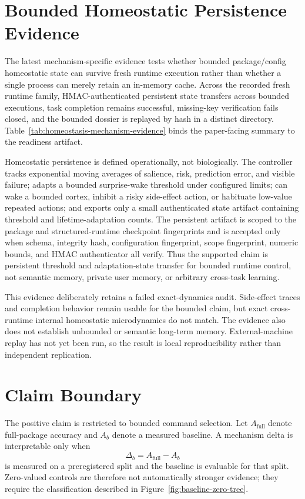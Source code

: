 \documentclass[11pt]{article}
\begin{document}
\section{Bounded Homeostatic Persistence Evidence}

The latest mechanism-specific evidence tests whether bounded package/config
homeostatic state can survive fresh runtime execution rather than whether a
single process can merely retain an in-memory cache. Across the recorded fresh
runtime family, HMAC-authenticated persistent state transfers across bounded
executions, task completion remains successful, missing-key verification fails
closed, and the bounded dossier is replayed by hash in a distinct directory.
Table~\ref{tab:homeostasis-mechanism-evidence} binds the paper-facing summary to
the readiness artifact.

Homeostatic persistence is defined operationally, not biologically. The
controller tracks exponential moving averages of salience, risk, prediction
error, and visible failure; adapts a bounded surprise-wake threshold under
configured limits; can wake a bounded cortex, inhibit a risky side-effect
action, or habituate low-value repeated actions; and exports only a small
authenticated state artifact containing threshold and lifetime-adaptation
counts. The persistent artifact is scoped to the package and structured-runtime
checkpoint fingerprints and is accepted only when schema, integrity hash,
configuration fingerprint, scope fingerprint, numeric bounds, and HMAC
authenticator all verify. Thus the supported claim is persistent threshold and
adaptation-state transfer for bounded runtime control, not semantic memory,
private user memory, or arbitrary cross-task learning.

This evidence deliberately retains a failed exact-dynamics audit. Side-effect
traces and completion behavior remain usable for the bounded claim, but exact
cross-runtime internal homeostatic microdynamics do not match. The evidence also
does not establish unbounded or semantic long-term memory. External-machine
replay has not yet been run, so the result is local reproducibility rather than
independent replication.



\section{Claim Boundary}

The positive claim is restricted to bounded command selection. Let
\(A_{\mathrm{full}}\) denote full-package accuracy and \(A_b\) denote a measured
baseline. A mechanism delta is interpretable only when
\[
  \Delta_b = A_{\mathrm{full}} - A_b
\]
is measured on a preregistered split and the baseline is evaluable for that
split. Zero-valued controls are therefore not automatically stronger evidence;
they require the classification described in
Figure~\ref{fig:baseline-zero-tree}.
\end{document}
